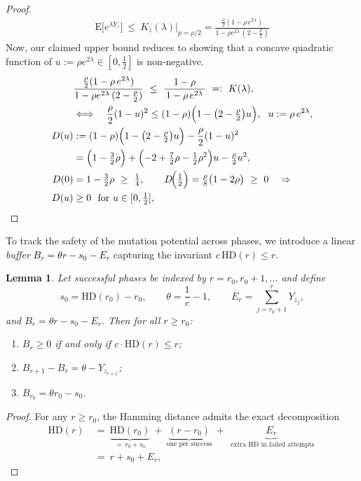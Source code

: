 \documentclass[lettersize,journal]{IEEEtran}
\newcommand{\new}[1]{\textcolor{black}{#1}}
\newcommand{\EE}{\text{E}}
\newcommand{\HD}{\text{HD}}
\newtheorem{lemma}{Lemma}
\begin{document}
{\begin{proof}
	\begin{align*}
		\EE\!\big[e^{\lambda Y_z}\big]
		\ \le\ K_z(\lambda)\Big|_{p=\rho/2}=\frac{\tfrac{\rho}{2}(1-\rho\,e^{2\lambda})}{1-\rho e^{2\lambda}\,(2-\tfrac{\rho}{2})}
	\end{align*}
	Now, our claimed upper bound reduces to showing that a concave quadratic function of $u:=\rho e^{2\lambda} \in \left[0,\frac{1}{2}\right]$ is non-negative.
	\begin{align*}
		&\frac{\tfrac{\rho}{2}(1-\rho\,e^{2\lambda})}{1-\rho e^{2\lambda}\,(2-\tfrac{\rho}{2})}
		\  \le\ \frac{1-\rho}{\,1-\rho\,e^{2\lambda}\,}
		\ =:\ K(\lambda),
		\\&\Longleftrightarrow\quad
		\frac{\rho}{2}(1-u)^2 \le (1-\rho)\Bigl(1-\bigl(2-\tfrac{\rho}{2}\bigr)u\Bigr),\ \ u:=\rho\,e^{2\lambda},
		\\
		D(u)
		&:=(1-\rho)\Bigl(1-\bigl(2-\tfrac{\rho}{2}\bigr)u\Bigr)-\frac{\rho}{2}(1-u)^2
		\\&= \Bigl(1-\tfrac{3}{2}\rho\Bigr)+\Bigl(-2+\tfrac{7}{2}\rho-\tfrac{1}{2}\rho^2\Bigr)u-\tfrac{\rho}{2}u^2,
		\\
		D(0)&=1-\tfrac{3}{2}\rho\ \ge\ \tfrac14,\qquad
		D\!\Big(\tfrac12\Big)=\tfrac{\rho}{8}\bigl(1-2\rho\bigr)\ \ge\ 0
		\quad\Rightarrow\quad \\
		D(u)&\ge 0\ \text{ for }u\in[0,\tfrac12],
	\end{align*}
	
	
\end{proof}


To track the safety of the mutation potential across phases, we introduce a 
linear \emph{buffer} \new{$B_r = \theta r - s_0 - E_r$} capturing the invariant $c\,\mathrm{HD}(r)\le r$.

\begin{lemma}\label{lem:buffer}
	Let successful phases be indexed by $r=r_0,r_0+1,\dots$ and define
	\[
	s_0=\mathrm{HD}(r_0)-r_0, \qquad 
	\theta=\frac{1}{c}-1, \qquad
	E_r=\sum_{j=r_0+1}^{r} Y_{z_j},
	\]
	and $B_r = \theta r - s_0 - E_r$.
	Then for all $r\ge r_0$:
	\begin{enumerate}
		\item 
		$B_r\ge0$ if and only if $c\cdot\mathrm{HD}(r)\le r$;
		\item 
		$B_{r+1}-B_r=\theta-Y_{z_{r+1}}$;
		\item 
		$B_{r_0}=\theta r_0 - s_0$.
	\end{enumerate}
\end{lemma}

\begin{proof}
	For any $r\ge r_0$, the Hamming distance admits the exact decomposition
	\begin{align*}
		\HD(r)\ &=\ \underbrace{\HD(r_0)}_{=\,r_0+s_0}\ +\ \underbrace{(r-r_0)}_{\text{one per success}}\ +\ \underbrace{E_r}_{\text{ extra HD in failed attempts}}
		\ \\&=\ r+s_0+E_r,		
	\end{align*}
	

\end{proof}}
\end{document}
